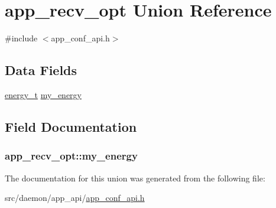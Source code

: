 \hypertarget{unionapp__recv__opt}{}\section{app\+\_\+recv\+\_\+opt Union Reference}
\label{unionapp__recv__opt}


{\ttfamily \#include $<$app\+\_\+conf\+\_\+api.\+h$>$}

\subsection*{Data Fields}
\begin{DoxyCompactItemize}
\item 
\hyperlink{app__conf__api_8h_ab789e505b2f54ce4fc39803a745e4b51}{energy\+\_\+t} \hyperlink{unionapp__recv__opt_a5f26b28d81f98b6b83965357d533d422}{my\+\_\+energy}
\end{DoxyCompactItemize}


\subsection{Field Documentation}
\subsubsection[{\texorpdfstring{my\+\_\+energy}{my_energy}}]{ app\+\_\+recv\+\_\+opt\+::my\+\_\+energy}\hypertarget{unionapp__recv__opt_a5f26b28d81f98b6b83965357d533d422}{}\label{unionapp__recv__opt_a5f26b28d81f98b6b83965357d533d422}


The documentation for this union was generated from the following file\+:\begin{DoxyCompactItemize}
\item 
src/daemon/app\+\_\+api/\hyperlink{app__conf__api_8h}{app\+\_\+conf\+\_\+api.\+h}\end{DoxyCompactItemize}
